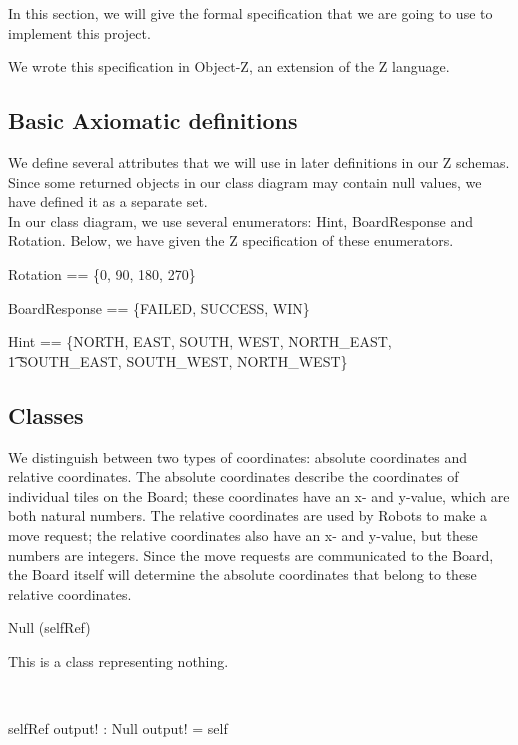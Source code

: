 In this section, we will give the formal specification that we are going to use to implement this project.

We wrote this specification in Object-Z, an extension of the Z language.

\subsection{Basic Axiomatic definitions}
We define several attributes that we will use in later definitions in our Z schemas. Since some returned objects in our class diagram may contain null values, we have defined it as a separate set. \\
In our class diagram, we use several enumerators: Hint, BoardResponse and Rotation. Below, we have given the Z specification of these enumerators.

\begin{axdef}
Rotation == \{0, 90, 180, 270\}
\end{axdef}

\begin{axdef}
BoardResponse == \{FAILED, SUCCESS, WIN\}
\end{axdef}

\begin{axdef}
Hint == \{NORTH, EAST, SOUTH, WEST, NORTH\_EAST, \\ \t1 SOUTH\_EAST, SOUTH\_WEST, NORTH\_WEST\}
\end{axdef}

\subsection{Classes}
We distinguish between two types of coordinates: absolute coordinates and relative coordinates. The absolute coordinates describe the coordinates of individual tiles on the Board; these coordinates have an x- and y-value, which are both natural numbers. The relative coordinates are used by Robots to make a move request; the relative coordinates also have an x- and y-value, but these numbers are integers. Since the move requests are communicated to the Board, the Board itself will determine the absolute coordinates that belong to these relative coordinates.

\begin{class}{Null}
\upharpoonright (selfRef) \\
\begin{classcom}
This is a class representing nothing.
\end{classcom} \\
\begin{schema}{selfRef}
output! : Null
\where
output! = self
\end{schema}
\end{class}

